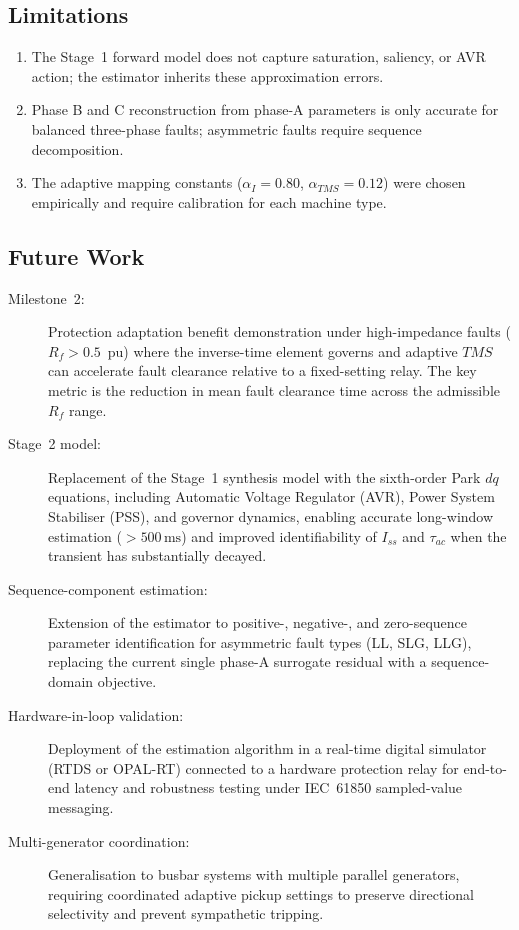 \documentclass[12pt, a4paper]{article}
\theoremstyle{definition}
\theoremstyle{plain}
\begin{document}
\subsection{Limitations}
\label{sec:conclusion:limitations}

\begin{enumerate}
  \item The Stage~1 forward model does not capture saturation, saliency,
        or AVR action; the estimator inherits these approximation errors.
  \item Phase B and C reconstruction from phase-A parameters is only accurate
        for balanced three-phase faults; asymmetric faults require sequence
        decomposition.
  \item The adaptive mapping constants ($\alpha_I = 0.80$, $\alpha_{TMS} = 0.12$)
        were chosen empirically and require calibration for each machine type.
\end{enumerate}

\subsection{Future Work}
\label{sec:conclusion:future}

\begin{description}
  \item[Milestone~2:] Protection adaptation benefit demonstration under
        high-impedance faults ($R_f > 0.5$~pu) where the inverse-time element
        governs and adaptive $TMS$ can accelerate fault clearance relative to a
        fixed-setting relay.  The key metric is the reduction in mean fault
        clearance time across the admissible $R_f$ range.

  \item[Stage~2 model:] Replacement of the Stage~1 synthesis model with the
        sixth-order Park $dq$ equations, including Automatic Voltage Regulator
        (AVR), Power System Stabiliser (PSS), and governor dynamics, enabling
        accurate long-window estimation ($> 500\,\text{ms}$) and improved
        identifiability of $I_{ss}$ and $\tau_{ac}$ when the transient has
        substantially decayed.

  \item[Sequence-component estimation:] Extension of the estimator to
        positive-, negative-, and zero-sequence parameter identification
        for asymmetric fault types (LL, SLG, LLG), replacing the current
        single phase-A surrogate residual with a sequence-domain objective.

  \item[Hardware-in-loop validation:] Deployment of the estimation algorithm
        in a real-time digital simulator (RTDS or OPAL-RT) connected to a
        hardware protection relay for end-to-end latency and robustness
        testing under IEC~61850 sampled-value messaging.

  \item[Multi-generator coordination:] Generalisation to busbar systems with
        multiple parallel generators, requiring coordinated adaptive pickup
        settings to preserve directional selectivity and prevent sympathetic
        tripping.
\end{description}
\end{document}
